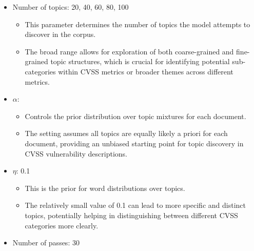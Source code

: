 \documentclass[12pt]{article}
\begin{document}
\begin{itemize}

	\item Number of topics: {20, 40, 60, 80, 100}

	      \begin{itemize}

		      \item This parameter determines the number of topics the model attempts to discover in
		            the corpus.

		      \item The broad range allows for exploration of both coarse-grained and fine-grained
		            topic structures, which is crucial for identifying potential sub-categories within
		            CVSS metrics or broader themes across different metrics.

	      \end{itemize}

	\item $\alpha$: {}

	      \begin{itemize}

		      \item Controls the prior distribution over topic mixtures for each document.

		      \item The  setting assumes all topics are equally likely a priori for each
		            document, providing an unbiased starting point for topic discovery in CVSS
		            vulnerability descriptions.

	      \end{itemize}

	\item $\eta$: {0.1}

	      \begin{itemize}

		      \item This is the prior for word distributions over topics.

		      \item The relatively small value of 0.1 can lead to more specific and distinct topics,
		            potentially helping in distinguishing between different CVSS categories more
		            clearly.

	      \end{itemize}

	\item Number of passes: {30}


\end{itemize}
\end{document}
